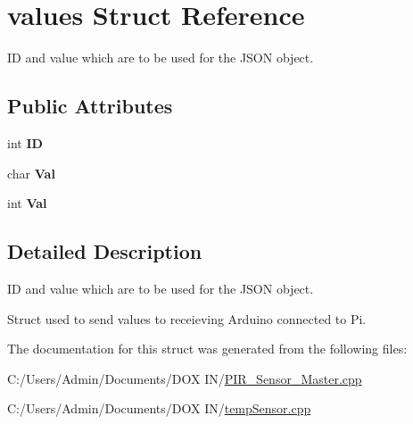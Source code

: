 \hypertarget{structvalues}{}\section{values Struct Reference}
\label{structvalues}


ID and value which are to be used for the J\+S\+ON object.  


\subsection*{Public Attributes}
\begin{DoxyCompactItemize}
\item 
\mbox{\label{structvalues_aa8db7f8ebe26e7fe5803385ac3971c10}} 
int {\bfseries ID}
\item 
\mbox{\label{structvalues_a4f3faa24760eb12e2574be1243b371ff}} 
char {\bfseries Val}
\item 
\mbox{\label{structvalues_a88e2006ee0406515fd04c54489708237}} 
int {\bfseries Val}
\end{DoxyCompactItemize}


\subsection{Detailed Description}
ID and value which are to be used for the J\+S\+ON object. 

Struct used to send values to receieving Arduino connected to Pi. 

The documentation for this struct was generated from the following files\+:\begin{DoxyCompactItemize}
\item 
C\+:/\+Users/\+Admin/\+Documents/\+D\+O\+X I\+N/\mbox{\hyperlink{_p_i_r___sensor___master_8cpp}{P\+I\+R\+\_\+\+Sensor\+\_\+\+Master.\+cpp}}\item 
C\+:/\+Users/\+Admin/\+Documents/\+D\+O\+X I\+N/\mbox{\hyperlink{temp_sensor_8cpp}{temp\+Sensor.\+cpp}}\end{DoxyCompactItemize}
